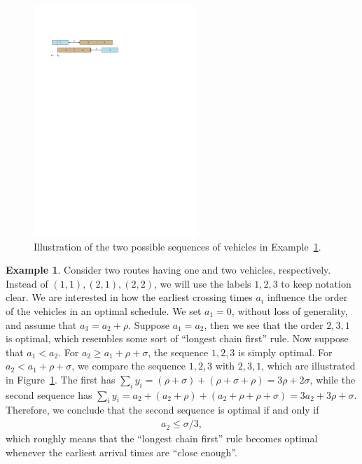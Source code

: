 \documentclass[a4paper]{report}
\theoremstyle{definition}
\newtheorem{eg}{Example}[chapter]
\theoremstyle{plain}
\begin{document}
\begin{figure}
  \centering
  \includegraphics[width=0.55\textwidth]{figures/single/123.pdf}
  \caption{Illustration of the two possible sequences of vehicles in
    Example~\ref{example2}.}
  \label{fig:example2}
\end{figure}

\begin{eg}
  \label{example2}
  Consider two routes having one and two vehicles, respectively. Instead of
  $(1,1), (2,1), (2,2)$, we will use the labels $1, 2, 3$ to keep notation
  clear. We are interested in how the earliest crossing times $a_i$ influence the
  order of the vehicles in an optimal schedule. We set $a_{1} = 0$, without loss
  of generality, and assume that $a_{3} = a_{2} + \rho$. Suppose
  $a_{1} = a_{2}$, then we see that the order $2, 3, 1$ is optimal, which
  resembles some sort of ``longest chain first'' rule. Now suppose that
  $a_{1} < a_{2}$. For $a_{2} \geq a_{1} + \rho + \sigma$, the sequence
  $1, 2, 3$ is simply optimal. For $a_{2} < a_{1} + \rho + \sigma$, we compare
  the sequence $1, 2, 3$ with $2, 3, 1$, which are illustrated in
  Figure~\ref{fig:example2}. The first has
  $\sum_{i} y_{i} = (\rho+\sigma) + (\rho+\sigma+\rho) = 3\rho + 2\sigma$,
  while the second sequence has
  $\sum_{i} y_{i} = a_{2} + (a_{2} + \rho) + (a_{2} + \rho + \rho + \sigma) = 3 a_{2} + 3\rho + \sigma$.
  Therefore, we conclude that the second sequence is optimal if and only if
  \begin{align}
    \label{eq:before-condition}
    a_{2} \leq \sigma/3 ,
  \end{align}
  which roughly means that the ``longest chain first'' rule becomes optimal
  whenever the earliest arrival times are ``close enough''.
\end{eg}
\end{document}
